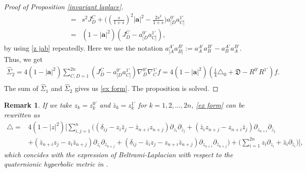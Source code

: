 \documentclass[a4paper,11pt]{amsart}
\numberwithin{equation}{section}
\newtheorem{rem}{Remark}[section]
\begin{document}
\begin{proof}[Proof of Proposition \ref{invariant laplace}]
\begin{equation*}
\begin{aligned}
=&s^2J_D^C+\bigg(\left(\frac{s}{1+s}\right)^2|\mathbf{a}|^2-\frac{2s^2}{1+s}\bigg)a_{[D}^{0'} a_{C]}^{1'}\\
=&(1-|\mathbf{a}|^2)\left(J_D^C-a_{[D}^{0'} a_{C]}^{1'}\right),
\end{aligned}\end{equation*}
by using \eqref{z jab} repeatedly. Here we use the notation $a_{[A}^{A'}a_{B]}^{B'}:=a_{A}^{A'}a_{B}^{B'}-a_{B}^{A'}a_{A}^{B'}$.
Thus, we get
\begin{equation*}\begin{aligned}
\widehat{\Sigma}_2
=4(1-|\mathbf{a}|^2)\sum_{C,D=1}^{2n}\left(J_D^C-a_{[D}^{0'}a_{C]}^{1'}\right)\nabla_{D}^{0'}\nabla_{C}^{1'} f=4(1-|\mathbf{a}|^2)\left( \frac14\triangle_0 + \mathfrak{D} -R^{0'}R^{1'} \right)f.\\
\end{aligned}\end{equation*}
The sum of $\widehat{\Sigma}_1$ and $\widehat{\Sigma}_2$ gives us \eqref{ex form}. The proposition is solved.
\end{proof}


\begin{rem}
If we take $z_k=z_k^{0'}$ and $\bar{z}_k=z_k^{1'}$ for $k=1,2,\dots,2n$, \eqref{ex form} can be rewritten as
\begin{equation*}\begin{aligned}
\triangle=&4(1-|z|^2)\bigg[\sum_{i,j=1}^{n}\bigg((\delta_{ij}-z_i\bar{z}_j-\bar{z}_{n+i}z_{n+j})\partial_{z_i}\partial_{\bar{z}_j}+(\bar{z}_iz_{n+j}-z_{n+i}\bar{z}_{j})\partial_{z_{n+i}}\partial_{\bar{z}_j}\\
&+(\bar{z}_{n+i}z_j-z_i\bar{z}_{n+j})\partial_{z_i}\partial_{\bar{z}_{n+j}}+(\delta_{ij}-\bar{z}_iz_j-z_{n+i}\bar{z}_{n+j})\partial_{z_{n+i}}\partial_{\bar{z}_{n+j}}\bigg)+\bigg(\sum_{i=1}^{2n}z_i\partial_{z_i}+\bar{z}_i\partial_{\bar{z}_i}\bigg)\bigg],
\end{aligned}\end{equation*}
which concides with the expression of Beltrami-Laplacian with respect to the quaternionic hyperbolic metric in \cite{Lu}.


\end{rem}
\end{document}
